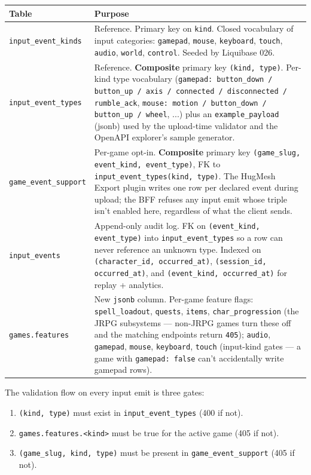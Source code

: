 \begin{tabularx}{\linewidth}{l X}
\toprule
\textbf{Table} & \textbf{Purpose} \\
\midrule
\texttt{input\_event\_kinds} & Reference. Primary key on
\texttt{kind}. Closed vocabulary of input categories: \texttt{gamepad},
\texttt{mouse}, \texttt{keyboard}, \texttt{touch}, \texttt{audio},
\texttt{world}, \texttt{control}. Seeded by Liquibase 026. \\

\texttt{input\_event\_types} & Reference. \textbf{Composite}
primary key \texttt{(kind, type)}. Per-kind type vocabulary
(\texttt{gamepad: button\_down / button\_up / axis / connected /
disconnected / rumble\_ack}, \texttt{mouse: motion / button\_down /
button\_up / wheel}, ...) plus an \texttt{example\_payload} (jsonb)
used by the upload-time validator and the OpenAPI explorer's sample
generator. \\

\texttt{game\_event\_support} & Per-game opt-in. \textbf{Composite}
primary key \texttt{(game\_slug, event\_kind, event\_type)}, FK to
\texttt{input\_event\_types(kind, type)}. The HugMesh Export
plugin writes one row per declared event during upload; the BFF
refuses any input emit whose triple isn't enabled here, regardless
of what the client sends. \\

\texttt{input\_events} & Append-only audit log. FK on
\texttt{(event\_kind, event\_type)} into
\texttt{input\_event\_types} so a row can never reference an
unknown type. Indexed on \texttt{(character\_id, occurred\_at)},
\texttt{(session\_id, occurred\_at)}, and
\texttt{(event\_kind, occurred\_at)} for replay + analytics. \\

\texttt{games.features} & New \texttt{jsonb} column. Per-game
feature flags: \texttt{spell\_loadout}, \texttt{quests},
\texttt{items}, \texttt{char\_progression} (the JRPG subsystems —
non-JRPG games turn these off and the matching endpoints return
\texttt{405}); \texttt{audio}, \texttt{gamepad}, \texttt{mouse},
\texttt{keyboard}, \texttt{touch} (input-kind gates — a game with
\texttt{gamepad: false} can't accidentally write gamepad rows). \\
\bottomrule
\end{tabularx}

\bigskip

The validation flow on every input emit is three gates:
\begin{enumerate}
  \item \texttt{(kind, type)} must exist in
        \texttt{input\_event\_types} (400 if not).
  \item \texttt{games.features.<kind>} must be true
        for the active game (405 if not).
  \item \texttt{(game\_slug, kind, type)} must be present in
        \texttt{game\_event\_support} (405 if not).
\end{enumerate}

